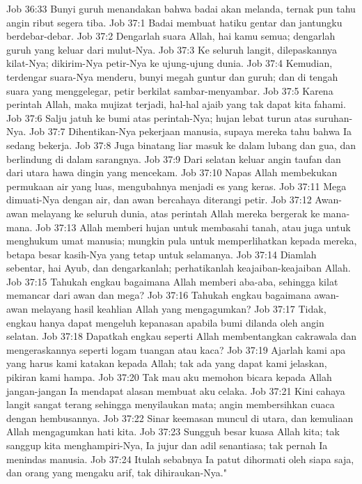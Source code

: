 Job 36:33  Bunyi guruh menandakan bahwa badai akan melanda, ternak pun tahu angin ribut segera tiba.
Job 37:1  Badai membuat hatiku gentar dan jantungku berdebar-debar.
Job 37:2  Dengarlah suara Allah, hai kamu semua; dengarlah guruh yang keluar dari mulut-Nya.
Job 37:3  Ke seluruh langit, dilepaskannya kilat-Nya; dikirim-Nya petir-Nya ke ujung-ujung dunia.
Job 37:4  Kemudian, terdengar suara-Nya menderu, bunyi megah guntur dan guruh; dan di tengah suara yang menggelegar, petir berkilat sambar-menyambar.
Job 37:5  Karena perintah Allah, maka mujizat terjadi, hal-hal ajaib yang tak dapat kita fahami.
Job 37:6  Salju jatuh ke bumi atas perintah-Nya; hujan lebat turun atas suruhan-Nya.
Job 37:7  Dihentikan-Nya pekerjaan manusia, supaya mereka tahu bahwa Ia sedang bekerja.
Job 37:8  Juga binatang liar masuk ke dalam lubang dan gua, dan berlindung di dalam sarangnya.
Job 37:9  Dari selatan keluar angin taufan dan dari utara hawa dingin yang mencekam.
Job 37:10  Napas Allah membekukan permukaan air yang luas, mengubahnya menjadi es yang keras.
Job 37:11  Mega dimuati-Nya dengan air, dan awan bercahaya diterangi petir.
Job 37:12  Awan-awan melayang ke seluruh dunia, atas perintah Allah mereka bergerak ke mana-mana.
Job 37:13  Allah memberi hujan untuk membasahi tanah, atau juga untuk menghukum umat manusia; mungkin pula untuk memperlihatkan kepada mereka, betapa besar kasih-Nya yang tetap untuk selamanya.
Job 37:14  Diamlah sebentar, hai Ayub, dan dengarkanlah; perhatikanlah keajaiban-keajaiban Allah.
Job 37:15  Tahukah engkau bagaimana Allah memberi aba-aba, sehingga kilat memancar dari awan dan mega?
Job 37:16  Tahukah engkau bagaimana awan-awan melayang hasil keahlian Allah yang mengagumkan?
Job 37:17  Tidak, engkau hanya dapat mengeluh kepanasan apabila bumi dilanda oleh angin selatan.
Job 37:18  Dapatkah engkau seperti Allah membentangkan cakrawala dan mengeraskannya seperti logam tuangan atau kaca?
Job 37:19  Ajarlah kami apa yang harus kami katakan kepada Allah; tak ada yang dapat kami jelaskan, pikiran kami hampa.
Job 37:20  Tak mau aku memohon bicara kepada Allah jangan-jangan Ia mendapat alasan membuat aku celaka.
Job 37:21  Kini cahaya langit sangat terang sehingga menyilaukan mata; angin membersihkan cuaca dengan hembusannya.
Job 37:22  Sinar keemasan muncul di utara, dan kemuliaan Allah mengagumkan hati kita.
Job 37:23  Sungguh besar kuasa Allah kita; tak sanggup kita menghampiri-Nya, Ia jujur dan adil senantiasa; tak pernah Ia menindas manusia.
Job 37:24  Itulah sebabnya Ia patut dihormati oleh siapa saja, dan orang yang mengaku arif, tak dihiraukan-Nya."
